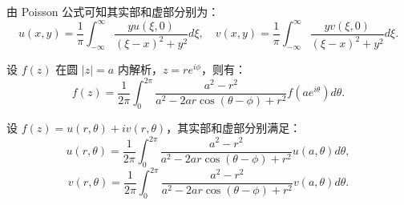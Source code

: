 \begin{theorem}
由 Poisson 公式可知其实部和虚部分别为：
\[
u(x, y) = \frac{1}{\pi} \int_{-\infty}^{\infty} \frac{y u(\xi, 0)}{(\xi - x)^2 + y^2} d\xi, \quad
v(x, y) = \frac{1}{\pi} \int_{-\infty}^{\infty} \frac{y v(\xi, 0)}{(\xi - x)^2 + y^2} d\xi.
\]
\end{theorem}

\begin{theorem}
设 \(f(z)\) 在圆 \(|z| = a\) 内解析，\(z = r e^{i\phi}\)，则有：
\[
f(z) = \frac{1}{2\pi} \int_0^{2\pi} \frac{a^2 - r^2}{a^2 - 2ar\cos(\theta - \phi) + r^2} f(a e^{i\theta}) d\theta.
\]
\end{theorem}

\begin{theorem}
设 \(f(z) = u(r,\theta) + i v(r,\theta)\)，其实部和虚部分别满足：
\[
u(r,\theta) = \frac{1}{2\pi} \int_0^{2\pi} \frac{a^2 - r^2}{a^2 - 2ar\cos(\theta - \phi) + r^2} u(a,\theta) d\theta,
\]
\[
v(r,\theta) = \frac{1}{2\pi} \int_0^{2\pi} \frac{a^2 - r^2}{a^2 - 2ar\cos(\theta - \phi) + r^2} v(a,\theta) d\theta.
\]
\end{theorem}
